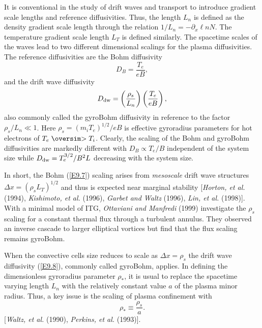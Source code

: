 \documentclass[a4paper,openany,12pt]{book}
\def\nms{\mathsurround=0pt}
\def\gtsim{\mathrel{\mathpalette\oversim>}} %
\def\oversim#1#2{\lower 2pt\vbox{\baselineskip 0pt \lineskip 1pt
    \ialign{$\nms#1\hfil##\hfil$\crcr#2\crcr\sim\crcr}}}
\begin{document}
It is conventional in the study of drift waves and transport to introduce gradient scale lengths and reference diffusivities. Thus, the length $L_n$ is defined as the density gradient scale length through the relation $1/L_n=-\partial_x\ell nN$. The temperature gradient scale length $L_T$ is defined similarly. The spacetime scales of the waves lead to two different dimensional scalings for the plasma diffusivities. The reference diffusivities are the Bohm diffusivity
\begin{equation}
D_B=\frac{T_e}{eB},
\label{E9.7}
\end{equation}
and the drift wave diffusivity
\begin{equation}
D_{\rm dw}=\left(\frac{\rho_s}{L_n}\right)\left(\frac{T_e}{eB}\right),
\label{E9.8}
\end{equation}
also commonly called the gyroBohm diffusivity in reference to the factor 
$\rho_s/L_n\ll 1$. Here $\rho_s=(m_iT_e)^{1/2}/eB$ is effective gyroradius parameters for hot electrons of $T_e\gtsim T_i$. Clearly, the scaling of the Bohm and gyroBohm diffusivities are markedly different with $D_B\propto T_e/B$ independent of the system size while $D_{\rm dw}=T_e^{3/2}/B^2 L$ decreasing with the system size. 

In short, the Bohm (\ref{E9.7}) scaling arises from {\it mesoscale} drift wave structures $\Delta x=(\rho_sL_T)^{1/2}$ and thus is expected near marginal stability [\emph{Horton, et al.} (1994), \emph{Kishimoto, et al.} (1996), \emph{Garbet and Waltz} (1996), \emph{Lin, et al.} (1998)]. With a minimal model of ITG, \emph{Ottaviani and Manfredi} (1999) investigate the $\rho_s$ scaling for a constant thermal flux through a turbulent annulus. They observed an inverse cascade to larger elliptical vortices but find that the flux scaling remains gyroBohm. 

When the convective cells size reduces to scale as $\Delta x=\rho_s$ the drift wave diffusivity (\ref{E9.8}), commonly called gyroBohm, applies. In defining the dimensionless gyroradius parameter $\rho_*$, it is usual to replace the spacetime varying length $L_n$ with the relatively constant value $a$ of the plasma minor radius. Thus, a key issue is the scaling of plasma confinement with
\begin{equation}
\rho_*\equiv\frac{\rho_s}{a}.
\label{E9.9}
\end{equation}
[\emph{Waltz, et al.} (1990), \emph{Perkins, et al.} (1993)]. 
\end{document}
